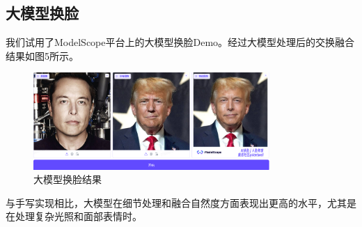 \subsection{大模型换脸}
我们试用了ModelScope平台上的大模型换脸Demo。经过大模型处理后的交换融合结果如图5所示。
\begin{figure}[h!]
    \centering
    \includegraphics[width=0.8\textwidth]{image/LM_swap.png}
    \caption{大模型换脸结果}
    \label{图5：}
\end{figure}
与手写实现相比，大模型在细节处理和融合自然度方面表现出更高的水平，尤其是在处理复杂光照和面部表情时。
